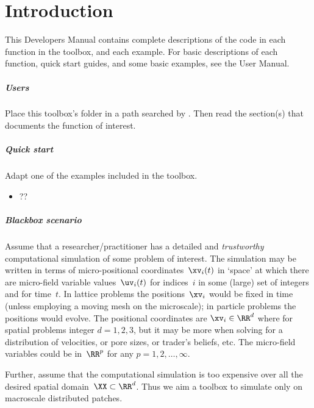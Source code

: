\chapter{Introduction}

\begin{devMan}
This Developers Manual contains complete descriptions of the code in each function in the toolbox, and each example.  For basic descriptions of each function, quick start guides, and some basic examples, see the User Manual.
\end{devMan}


\paragraph{Users}
Place this toolbox's folder in a path searched by \script.
Then read the section(s) that documents the function of interest.


\paragraph{Quick start}
Adapt one of the examples included in the toolbox.
\begin{itemize}
\item ??
\end{itemize}


\paragraph{Blackbox scenario}
Assume that a researcher\slash practitioner has a detailed and \emph{trustworthy} computational simulation of some problem of interest.
The simulation may be written in terms of micro-positional coordinates~\(\xv_i(t)\) in `space' at which there are micro-field variable values~\(\uv_i(t)\) for indices~\(i\) in some (large) set of integers and for time~\(t\).
In lattice problems the positions~\(\xv_i\) would be fixed in time (unless employing a moving mesh on the microscale); in particle problems the positions would evolve.
The positional coordinates are \(\xv_i\in\RR^{d}\) where for spatial problems integer \(d=1,2,3\), but it may be more when solving for a distribution of velocities, or pore sizes, or trader's beliefs, etc.
The micro-field variables could be in~\(\RR^{p}\) for any \(p=1,2,\ldots,\infty\).

Further, assume that the computational simulation is too expensive over all the desired spatial domain~\(\XX\subset\RR^{d}\).
Thus we aim a toolbox to simulate only on macroscale distributed patches.



